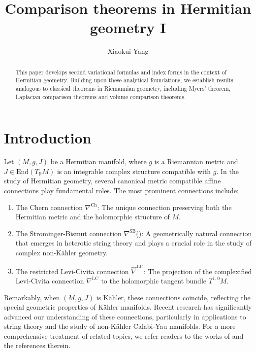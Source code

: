 \documentclass[12pt, reqno]{amsart}
\title{Comparison theorems in Hermitian geometry I}
\author{Xiaokui Yang}
\theoremstyle{plain}
\theoremstyle{definition}
\newcommand{\bd}{\begin{enumerate}}
\newcommand{\ed}{\end{enumerate}}
\renewcommand{\hat}{\widehat}
\renewcommand{\>}{\rightarrow}
\renewcommand{\>}{\rightarrow}
\numberwithin{equation}{section} %
\begin{document}
    \begin{abstract}This paper develops  second variational formulas and index forms in the context of Hermitian geometry. 
    Building upon these analytical foundations, we establish results analogous to classical theorems in Riemannian geometry, including Myers' theorem,  Laplacian comparison theorems and volume comparison theorems.
   \end{abstract}


   \maketitle



   \section{Introduction}

   Let $(M, g, J)$ be a Hermitian manifold, where $g$ is a Riemannian metric and $J \in \mathrm{End}(T_\mathbb{R} M)$ is an integrable complex structure compatible with $g$. In the study of Hermitian geometry, several canonical metric compatible affine connections play fundamental roles.  The most prominent connections include: \bd \item The Chern connection $\nabla^{\mathrm{Ch}}$: The unique connection preserving both the Hermitian metric  and the holomorphic structure of $M$.

    \item The Strominger-Bismut connection $\nabla^{\mathrm{SB}}$(\cite{Str86, Bis89}): A geometrically natural connection that emerges in heterotic string theory and plays a crucial role in the study of complex non-K\"ahler geometry.

    \item The restricted Levi-Civita connection $\hat\nabla^{\mathrm{LC}}$: The projection of the complexified Levi-Civita connection $\nabla^{\mathrm{LC}}$ to the holomorphic tangent bundle $T^{1,0}M$. \ed
   Remarkably, when $(M, g, J)$ is K\"ahler, these connections coincide, reflecting the special geometric properties of K\"ahler manifolds. Recent research has significantly advanced our understanding of these connections, particularly in applications to string theory and the study of non-K\"ahler Calabi-Yau manifolds. For a more comprehensive treatment of related topics, we refer  readers to  the works of
    \cite{AD99, IP01, FG04, LY05, Tos07, FY08, FTY09, Fu10,  Li10,  LY12, Zha12,ACS15,
    FY15, AU16, LY16,WYZ16, Yang16, LU17,  OUV17, Yu18, AOUV18, CZ18,  HLY18, NZ18, YZ18a, YZ18b,  FZ19, CCN19, FZ19, Yang19, YZZ19, ZZ19a, Yang20, NZ23, WY25} and the references therein.\\
\end{document}
